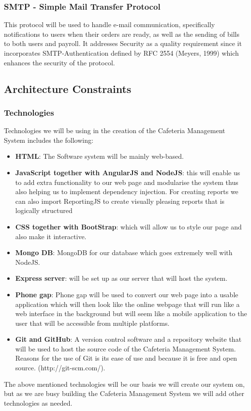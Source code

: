 \documentclass[a4paper,12pt]{article}
\begin{document}
\subsubsection{SMTP - Simple Mail Transfer Protocol}
This protocol will be used to handle e-mail communication, specifically notifications to users when their orders are ready, as well as the sending of bills to both users and payroll. It addresses Security as a quality requirement since it incorporates SMTP-Authentication defined by RFC 2554 (Meyers, 1999) which enhances the security of the protocol.

\subsection{Architecture Constraints}
\subsubsection{Technologies}
Technologies we will be using in the creation of the Cafeteria Management System includes the following: 

\begin{itemize}
  \item \textbf{HTML}: The Software system will be mainly web-based.

  \item \textbf{JavaScript together with AngularJS  and NodeJS}: this will enable us to add extra functionality to our web page and modularise the system thus also helping us to implement dependency injection. For creating reports we can also import ReportingJS to create visually pleasing reports that is logically structured

 \item \textbf{CSS together with BootStrap}: which will allow us to style our page and also make it interactive.

 \item \textbf{Mongo DB}: MongoDB for our database which goes extremely well with NodeJS. 

 \item \textbf{Express server}: will be set up as our server that will host the system.

 \item \textbf{Phone gap}: Phone gap will be used to convert our web page into a usable application which will then look like the online webpage that will run like a web interface in the background but  will seem like a mobile application to the user that will be accessible from multiple platforms.

\item \textbf{Git and GitHub}: A version control software and a repository website that will be used to host the source code of the Cafeteria Management System. Reasons for the use of Git is its ease of use and because it is free and open source. (http://git-scm.com/).

\end{itemize}
The above mentioned technologies will be our basis we will create our system on, but as we are busy building the Cafeteria Management System we will add other technologies as needed. 
\end{document}

